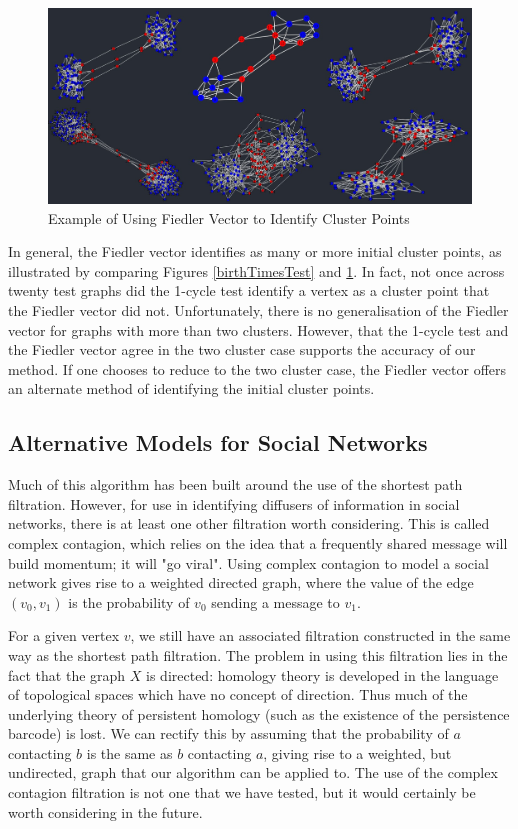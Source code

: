\documentclass[12pt,a4paper]{amsart}
\numberwithin{equation}{section}
\theoremstyle{plain}
\theoremstyle{definition}
\begin{document}
\begin{figure}[h]
	\centering
	\includegraphics[scale=0.55]{FiedlerClusterPoints.jpg}
	\caption{Example of Using Fiedler Vector to Identify Cluster Points}
	\label{fiedlerTest}
\end{figure}

\newpage

In general, the Fiedler vector identifies as many or more initial cluster points, as illustrated by comparing Figures \ref{birthTimesTest} and \ref{fiedlerTest}. In fact, not once across twenty test graphs did the 1-cycle test identify a vertex as a cluster point that the Fiedler vector did not. Unfortunately, there is no generalisation of the Fiedler vector for graphs with more than two clusters. However, that the 1-cycle test and the Fiedler vector agree in the two cluster case supports the accuracy of our method. If one chooses to reduce to the two cluster case, the Fiedler vector offers an alternate method of identifying the initial cluster points.

\subsection*{Alternative Models for Social Networks} Much of this algorithm has been built around the use of the shortest path filtration. However, for use in identifying diffusers of information in social networks, there is at least one other filtration worth considering. This is called complex contagion, which relies on the idea that a frequently shared message will build momentum; it will "go viral". Using complex contagion to model a social network gives rise to a weighted directed graph, where the value of the edge $(v_0,v_1)$ is the probability of $v_0$ sending a message to $v_1$. 

For a given vertex $v$, we still have an associated filtration constructed in the same way as the shortest path filtration. The problem in using this filtration lies in the fact that the graph $X$ is directed: homology theory is developed in the language of topological spaces which have no concept of direction. Thus much of the underlying theory of persistent homology (such as the existence of the persistence barcode) is lost. We can rectify this by assuming that the probability of $a$ contacting $b$ is the same as $b$ contacting $a$, giving rise to a weighted, but undirected, graph that our algorithm can be applied to. The use of the complex contagion filtration is not one that we have tested, but it would certainly be worth considering in the future. 
\end{document}
